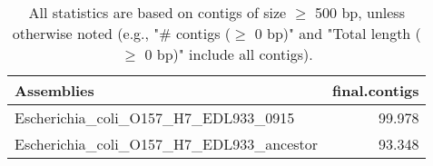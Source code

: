 \documentclass[12pt,a4paper]{article}
\begin{document}
\begin{table}[ht]
\begin{center}
\caption{All statistics are based on contigs of size $\geq$ 500 bp, unless otherwise noted (e.g., "\# contigs ($\geq$ 0 bp)" and "Total length ($\geq$ 0 bp)" include all contigs).}
\begin{tabular}{|l*{1}{|r}|}
\hline
Assemblies & final.contigs \\ \hline
Escherichia\_coli\_O157\_H7\_EDL933\_0915 & 99.978 \\ \hline
Escherichia\_coli\_O157\_H7\_EDL933\_ancestor & 93.348 \\ \hline
\end{tabular}
\end{center}
\end{table}
\end{document}
